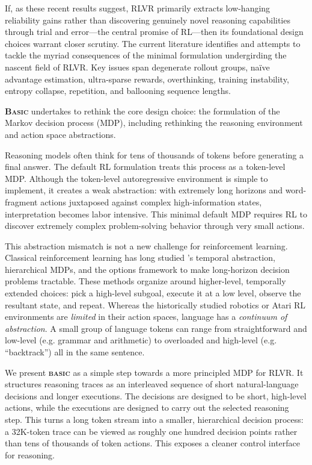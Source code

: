 \documentclass[10pt,twocolumn]{article}
\newcommand{\methodnamestart}{\textbf{\textsf{\textsc{Basic}}}}
\newcommand{\methodname}{\textbf{\textsf{\textsc{basic}}}}
\newcommand{\methodnamestart}{{\sffamily\bfseries B{\fontsize{0.9em}{0.9em}\selectfont ASIC}}}
\newcommand{\methodname}{{\sffamily\bfseries{\fontsize{0.95em}{0.95em}\selectfont BASIC}}}
\begin{document}
If, as these recent results suggest, RLVR primarily extracts low-hanging reliability
gains rather than discovering genuinely novel reasoning capabilities through trial and
error---the central promise of RL---then its foundational design choices warrant closer
scrutiny. The current literature identifies and attempts to tackle the myriad
consequences of the minimal formulation undergirding the nascent field of RLVR. Key
issues span degenerate rollout groups, naïve advantage estimation, ultra-sparse
rewards, overthinking, training instability, entropy collapse, repetition, and
ballooning sequence lengths.

\methodnamestart{} undertakes to rethink the core design choice: the
formulation of the Markov decision process (MDP), including rethinking the reasoning
environment and action space abstractions.

Reasoning models often think for tens of thousands of tokens before generating a final
answer. The default RL formulation treats this process as a token-level
MDP. Although the token-level autoregressive environment is
simple to implement, it creates a weak abstraction: with extremely long horizons and
word-fragment actions juxtaposed against complex high-information states,
interpretation becomes labor intensive. This minimal default MDP requires RL to
discover extremely complex problem-solving behavior through very small actions.

This abstraction mismatch is not a new challenge for reinforcement learning. Classical
reinforcement learning has
long studied \citeauthor{sutton1999between}'s temporal abstraction, hierarchical MDPs, and
the options framework to make long-horizon decision problems tractable. These methods
organize around higher-level, temporally extended choices: pick a high-level subgoal,
execute it at a low level, observe the resultant state, and repeat. Whereas the
historically studied robotics or Atari RL environments are \emph{limited}
in their action spaces, language has a \emph{continuum of abstraction}. A small group of
language tokens can range from straightforward and low-level (e.g. grammar and
arithmetic) to overloaded and high-level (e.g. ``backtrack'') all in the same
sentence.

We present \methodname{} as a simple step towards a more principled MDP
for RLVR. It structures reasoning traces as an interleaved sequence of short
natural-language decisions and longer executions. The decisions are designed to be
short, high-level actions, while the executions are designed to carry out the selected
reasoning step. This turns a long token stream into a smaller, hierarchical decision
process: a 32K-token trace can be viewed as roughly one hundred decision points rather
than tens of thousands of token actions. This exposes a cleaner control interface for
reasoning.
\end{document}
